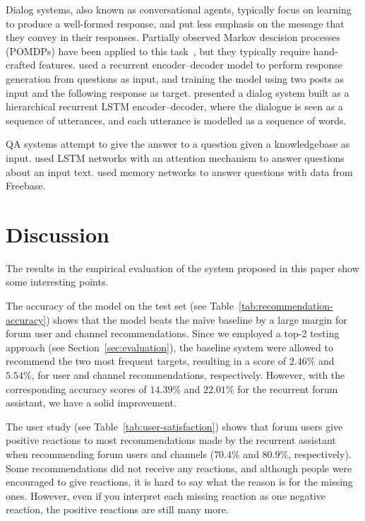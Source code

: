 \documentclass[11pt]{article}
\newenvironment{reasonable}{\par\color{blue}}{\par}
\newenvironment{reasonable}{\par\color{black}}{\par}
\begin{document}
\begin{reasonable}
Dialog systems, also known as conversational agents, typically focus on learning to produce a well-formed response, and put less emphasis on the message that they convey in their responses.
Partially observed Markov descision processes (POMDPs) have been applied to this task~\cite{young2013pomdp}, but they typically require hand-crafted features.
\cite{sordoni2015neural} used a recurrent encoder--decoder model to perform response generation from questions as input, and training the model using two posts as input and the following response as target.
\cite{serban2016building} presented a dialog system built as a hierarchical recurrent LSTM encoder--decoder, where the dialogue is seen as a sequence of utterances, and each utterance is modelled as a sequence of words.

QA systems attempt to give the answer to a question given a knowledgebase as input. \cite{hermann2015teaching} used LSTM networks with an attention mechanism to answer questions about an input text. \cite{bordes2015largescale} used memory networks to answer questions with data from Freebase.
\end{reasonable}

\vspace{1em}

\section{Discussion}

The results in the empirical evaluation of the system proposed in this paper show some interesting points.

The accuracy of the model on the test set (see Table~\ref{tab:recommendation-accuracy}) shows that the model beats the na\"ive baseline by a large margin for forum user and channel recommendations.
Since we employed a top-2 testing approach (see Section~\ref{sec:evaluation}), the baseline system were allowed to recommend the two most frequent targets, resulting in a score of $2.46\%$ and $5.54\%$, for user and channel recommendations, respectively. However, with the corresponding accuracy scores of $14.39\%$ and $22.01\%$ for the recurrent forum assistant, we have a solid improvement.

The user study (see Table~\ref{tab:user-satisfaction}) shows that forum users give positive reactions to most recommendations made by the recurrent assistant when recommending forum users and channels  ($70.4\%$ and $80.9\%$, respectively).
Some recommendations did not receive any reactions, and although people were encouraged to give reactions, it is hard to say what the reason is for the missing ones.
However, even if you interpret each missing reaction as one negative reaction, the positive reactions are still many more.
\end{document}

